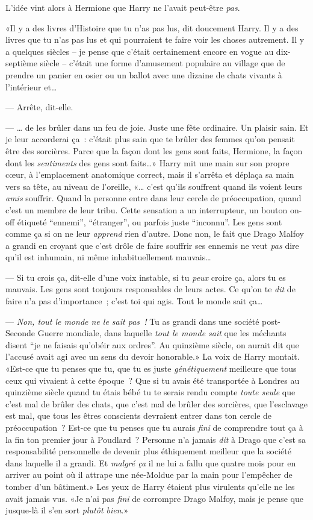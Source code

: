 L'idée vint alors à Hermione que Harry ne l'avait peut-être \emph{pas}.

«Il y a des livres d'Histoire que tu n'as pas lus, dit doucement Harry. Il y a des livres que tu n'as pas lus et qui pourraient te faire voir les choses autrement. Il y a quelques siècles -- je pense que c'était certainement encore en vogue au dix-septième siècle -- c'était une forme d'amusement populaire au village que de prendre un panier en osier ou un ballot avec une dizaine de chats vivants à l'intérieur et…

--- Arrête, dit-elle.

--- … de les brûler dans un feu de joie. Juste une fête ordinaire. Un plaisir sain. Et je leur accorderai ça~: c'était plus sain que te brûler des femmes qu'on pensait être des sorcières. Parce que la façon dont les gens sont faits, Hermione, la façon dont les \emph{sentiments} des gens sont faits…» Harry mit une main sur son propre cœur, à l'emplacement anatomique correct, mais il s'arrêta et déplaça sa main vers sa tête, au niveau de l'oreille, «… c'est qu'ils souffrent quand ils voient leurs \emph{amis} souffrir. Quand la personne entre dans leur cercle de préoccupation, quand c'est un membre de leur tribu. Cette sensation a un interrupteur, un bouton on-off étiqueté “ennemi”, “étranger”, ou parfois juste “inconnu”. Les gens sont comme ça si on ne leur \emph{apprend} rien d'autre. Donc non, le fait que Drago Malfoy a grandi en croyant que c'est drôle de faire souffrir ses ennemis ne veut \emph{pas} dire qu'il est inhumain, ni même inhabituellement mauvais…

--- Si tu crois ça, dit-elle d'une voix instable, si tu \emph{peux} croire ça, alors tu es mauvais. Les gens sont toujours responsables de leurs actes. Ce qu'on te \emph{dit} de faire n'a pas d'importance~; c'est toi qui agis. Tout le monde sait ça…

--- \emph{Non, tout le monde ne le sait pas~!} Tu as grandi dans une société post-Seconde Guerre mondiale, dans laquelle \emph{tout le monde sait} que les méchants disent “je ne faisais qu'obéir aux ordres”. Au quinzième siècle, on aurait dit que l'accusé avait agi avec un sens du devoir honorable.» La voix de Harry montait. «Est-ce que tu penses que tu, que tu es juste \emph{génétiquement} meilleure que tous ceux qui vivaient à cette époque~? Que si tu avais été transportée à Londres au quinzième siècle quand tu étais bébé tu te serais rendu compte \emph{toute seule} que c'est mal de brûler des chats, que c'est mal de brûler des sorcières, que l'esclavage est mal, que tous les êtres conscients devraient entrer dans ton cercle de préoccupation~? Est-ce que tu penses que tu aurais \emph{fini} de comprendre tout ça à la fin ton premier jour à Poudlard~? Personne n'a jamais \emph{dit} à Drago que c'est sa responsabilité personnelle de devenir plus éthiquement meilleur que la société dans laquelle il a grandi. Et \emph{malgré ça} il ne lui a fallu que quatre mois pour en arriver au point où il attrape une née-Moldue par la main pour l'empêcher de tomber d'un bâtiment.» Les yeux de Harry étaient plus virulents qu'elle ne les avait jamais vus. «Je n'ai pas \emph{fini} de corrompre Drago Malfoy, mais je pense que jusque-là il s'en sort \emph{plutôt bien}.»

